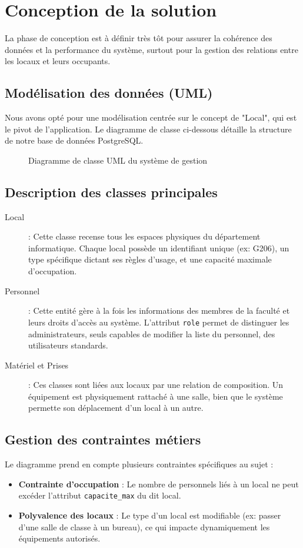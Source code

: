 \chapter{Conception de la solution}

La phase de conception est à définir très tôt pour assurer la cohérence des données et la performance du système, surtout pour la gestion des relations entre les locaux et leurs occupants.

\section{Modélisation des données (UML)}
Nous avons opté pour une modélisation centrée sur le concept de "Local", qui est le pivot de l'application. Le diagramme de classe ci-dessous détaille la structure de notre base de données PostgreSQL.

\begin{figure}[h]
    \centering
    \caption{Diagramme de classe UML du système de gestion}
    \label{fig:uml_classes}
\end{figure}

\section{Description des classes principales}

\begin{description}
    \item[Local] : Cette classe recense tous les espaces physiques du département informatique. Chaque local possède un identifiant unique (ex: G206), un type spécifique dictant ses règles d'usage, et une capacité maximale d'occupation.
    \item[Personnel] : Cette entité gère à la fois les informations des membres de la faculté et leurs droits d'accès au système. L'attribut \texttt{role} permet de distinguer les administrateurs, seuls capables de modifier la liste du personnel, des utilisateurs standards.
    \item[Matériel et Prises] : Ces classes sont liées aux locaux par une relation de composition. Un équipement est physiquement rattaché à une salle, bien que le système permette son déplacement d'un local à un autre.
\end{description}

\section{Gestion des contraintes métiers}
Le diagramme prend en compte plusieurs contraintes spécifiques au sujet :
\begin{itemize}
    \item \textbf{Contrainte d'occupation} : Le nombre de personnels liés à un local ne peut excéder l'attribut \texttt{capacite\_max} du dit local.
    \item \textbf{Polyvalence des locaux} : Le type d'un local est modifiable (ex: passer d'une salle de classe à un bureau), ce qui impacte dynamiquement les équipements autorisés.
\end{itemize}